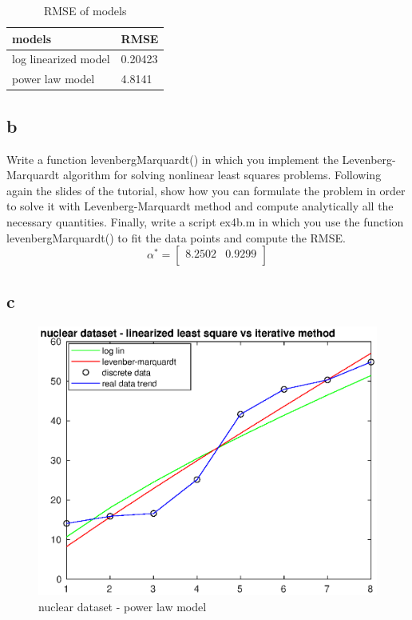 \documentclass[unicode,11pt,a4paper,oneside,numbers=endperiod,openany]{scrartcl}
\begin{document}
\begin{table}[H]
    \centering
    \caption{RMSE of models}
    \label{table:ex4a}
    \begin{tabular}{||l l||}
        \hline
        models               & RMSE    \\
        \hline\hline
        log linearized model & 0.20423 \\
        power law model      & 4.8141  \\
        \hline
    \end{tabular}
\end{table}

\subsection*{b}
Write a function levenbergMarquardt() in which you implement the Levenberg-Marquardt algorithm for
solving nonlinear least squares problems.
Following again the slides of the tutorial, show how you can formulate
the problem in order to solve it with Levenberg-Marquardt method and compute analytically all the necessary
quantities.
Finally, write a script ex4b.m in which you use the function levenbergMarquardt() to fit
the data points and compute the RMSE.\\

\[
    \alpha^* = \begin{bmatrix} 8.2502 & 0.9299 \\ \end{bmatrix}
\]

\subsection*{c}

\begin{figure}[H]
    \centering
    \caption{nuclear dataset - power law model}
    \label{fig:ex4c}
    \includegraphics[width=\textwidth]{ex4c.eps}
\end{figure}
\end{document}
